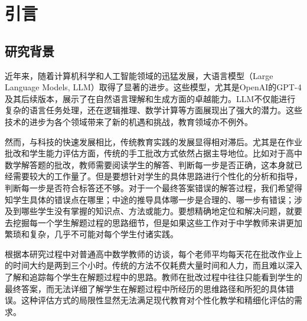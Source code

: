 
\chapter{引言}


\section{研究背景}

近年来，随着计算机科学和人工智能领域的迅猛发展，大语言模型（Large Language Models, LLM）取得了显著的进步。这些模型，尤其是OpenAI的GPT-4及其后续版本，展示了在自然语言理解和生成方面的卓越能力。LLM不仅能进行复杂的语言任务处理，还在逻辑推理、数学计算等方面展现出了强大的潜力。这些技术的进步为各个领域带来了新的机遇和挑战，教育领域亦不例外。

然而，与科技的快速发展相比，传统教育实践的发展显得相对滞后。尤其是在作业批改和学生能力评估方面，传统的手工批改方式依然占据主导地位。比如对于高中数学解答题的批改，教师需要阅读学生的解答、判断每一步是否正确，这本身就已经需要较大的工作量了。但是要想针对学生的具体思路进行个性化的分析和指导，判断每一步是否符合标答还不够。对于一个最终答案错误的解答过程，我们希望得知学生具体的错误点在哪里；中途的推导具体哪一步是合理的、哪一步有错误；涉及到哪些学生没有掌握的知识点、方法或能力。要想精确地定位和解决问题，就要去挖掘每一个学生解题过程的思路细节，但是如果这些工作对于中学教师来讲更加繁琐和复杂，几乎不可能对每个学生付诸实践。

根据本研究过程中对普通高中数学教师的访谈，每个老师平均每天花在批改作业上的时间大约是两到三个小时。传统的方法不仅耗费大量时间和人力，而且难以深入了解和追踪每个学生在解题过程中的思路。教师在批改过程中往往只能看到学生的最终答案，而无法详细了解学生在解题过程中所经历的思维路径和所犯的具体错误。这种评估方式的局限性显然无法满足现代教育对个性化教学和精细化评估的需求。

